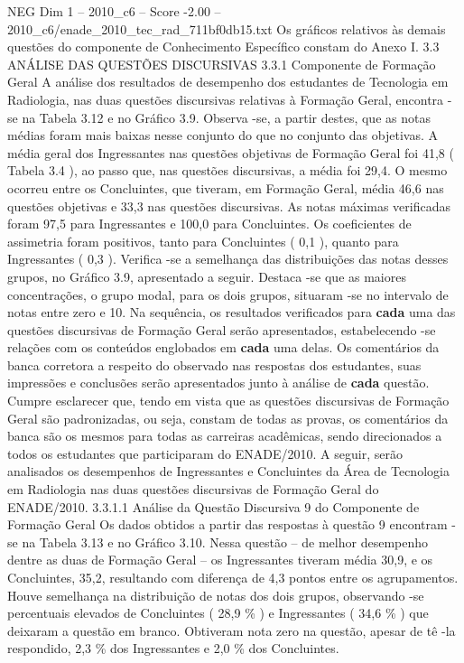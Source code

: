 \begin{textsample}{NEG Dim 1 – 2010\_c6 – Score -2.00 – 2010\_c6/enade\_2010\_tec\_rad\_711bf0db15.txt}
Os gráficos relativos às demais questões do componente de Conhecimento Específico constam do Anexo I. 3.3 ANÁLISE DAS QUESTÕES DISCURSIVAS 3.3.1 Componente de Formação Geral A análise dos resultados de desempenho dos estudantes de Tecnologia em Radiologia, nas duas questões discursivas relativas à Formação Geral, encontra -se na Tabela 3.12 e no Gráfico 3.9.
Observa -se, a partir destes, que as notas médias foram mais baixas nesse conjunto do que no conjunto das objetivas.
A média geral dos Ingressantes nas questões objetivas de Formação Geral foi 41,8 ( Tabela 3.4 ), ao passo que, nas questões discursivas, a média foi 29,4.
O mesmo ocorreu entre os Concluintes, que tiveram, em Formação Geral, média 46,6 nas questões objetivas e 33,3 nas questões discursivas.
As notas máximas verificadas foram 97,5 para Ingressantes e 100,0 para Concluintes.
Os coeficientes de assimetria foram positivos, tanto para Concluintes ( 0,1 ), quanto para Ingressantes ( 0,3 ).
Verifica -se a semelhança das distribuições das notas desses grupos, no Gráfico 3.9, apresentado a seguir.
Destaca -se que as maiores concentrações, o grupo modal, para os dois grupos, situaram -se no intervalo de notas entre zero e 10.
Na sequência, os resultados verificados para \textbf{cada} uma das questões discursivas de Formação Geral serão apresentados, estabelecendo -se relações com os conteúdos englobados em \textbf{cada} uma delas.
Os comentários da banca corretora a respeito do observado nas respostas dos estudantes, suas impressões e conclusões serão apresentados junto à análise de \textbf{cada} questão.
Cumpre esclarecer que, tendo em vista que as questões discursivas de Formação Geral são padronizadas, ou seja, constam de todas as provas, os comentários da banca são os mesmos para todas as carreiras acadêmicas, sendo direcionados a todos os estudantes que participaram do ENADE/2010.
A seguir, serão analisados os desempenhos de Ingressantes e Concluintes da Área de Tecnologia em Radiologia nas duas questões discursivas de Formação Geral do ENADE/2010. 3.3.1.1 Análise da Questão Discursiva 9 do Componente de Formação Geral Os dados obtidos a partir das respostas à questão 9 encontram -se na Tabela 3.13 e no Gráfico 3.10.
Nessa questão – de melhor desempenho dentre as duas de Formação Geral – os Ingressantes tiveram média 30,9, e os Concluintes, 35,2, resultando com diferença de 4,3 pontos entre os agrupamentos.
Houve semelhança na distribuição de notas dos dois grupos, observando -se percentuais elevados de Concluintes ( 28,9 \% ) e Ingressantes ( 34,6 \% ) que deixaram a questão em branco.
Obtiveram nota zero na questão, apesar de tê -la respondido, 2,3 \% dos Ingressantes e 2,0 \% dos Concluintes.

\end{textsample}
